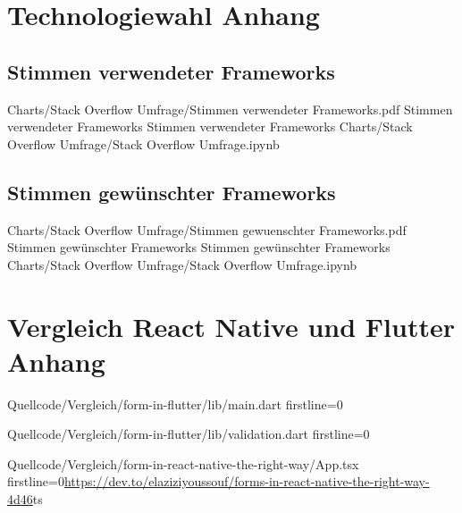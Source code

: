 \section{Technologiewahl Anhang} 

\subsection{Stimmen verwendeter Frameworks} 

\begin{alexfigurewithnotebook}{Charts/Stack Overflow Umfrage/Stimmen verwendeter Frameworks.pdf}
	{Stimmen verwendeter Frameworks}
	{Stimmen verwendeter Frameworks}
	{Charts/Stack Overflow Umfrage/Stack Overflow Umfrage.ipynb}
	{}
	\label{fig:StimmenVerwendeterFrameworks}
\end{alexfigurewithnotebook}

\subsection{Stimmen gewünschter Frameworks} 


\begin{alexfigurewithnotebook}{Charts/Stack Overflow Umfrage/Stimmen gewuenschter Frameworks.pdf}
	{Stimmen gewünschter Frameworks}
	{Stimmen gewünschter Frameworks}
	{Charts/Stack Overflow Umfrage/Stack Overflow Umfrage.ipynb}
	{}
	\label{fig:StimmenGewuenschterFrameworks}
\end{alexfigurewithnotebook}


\section{Vergleich React Native und Flutter Anhang} 

\begin{alexlisting}{}{}
  {Quellcode/Vergleich/form-in-flutter/lib/main.dart}
  {firstline=0}
  \label{lst:Schritt1KlasseLetzterStatus}
\end{alexlisting}

\begin{alexlisting}{}{}
  {Quellcode/Vergleich/form-in-flutter/lib/validation.dart}
  {firstline=0}
  \label{lst:Schritt1KlasseLetzterStatus}
\end{alexlisting}


\begin{fremdeslisting}{}{}
  {Quellcode/Vergleich/form-in-react-native-the-right-way/App.tsx}
  {firstline=0}{\url{https://dev.to/elaziziyoussouf/forms-in-react-native-the-right-way-4d46}}{ts}
  \label{lst:Schritt1KlasseLetzterStatus}
\end{fremdeslisting}

